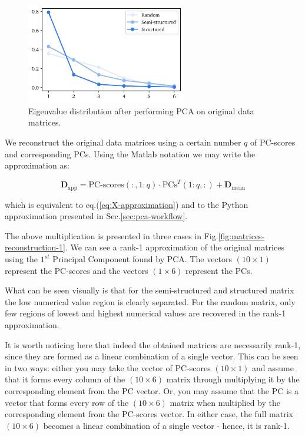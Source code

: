 \documentclass[10pt,twocolumn]{article}
\begin{document}
\begin{figure}[H]
\centering\includegraphics[width=7cm]{DWGs/matrix-reconstruction-eigenvalues-comparison.png}
\caption{Eigenvalue distribution after performing PCA on original data matrices.}			
\label{fig:eigenvalues}
\end{figure}

We reconstruct the original data matrices using a certain number $q$ of PC-scores and corresponding PCs. Using the Matlab notation we may write the approximation as:

\begin{equation} \label{eq:data-set-approximation}
\bm{D}_{\text{app}} = \text{PC-scores}(:,1:q) \cdot \text{PCs}^T(1:q,:) + \bm{D}_{\text{mean}}
\end{equation}

which is equivalent to eq.(\ref{eq:X-approximation}) and to the Python approximation presented in Sec.\ref{sec:pca-workflow}.

The above multiplication is presented in three cases in Fig.\ref{fig:matrices-reconstruction-1}. We can see a rank-1 approximation of the original matrices using the $1^{st}$ Principal Component found by PCA. The vectors $(10 \times 1)$ represent the PC-scores and the vectors $(1 \times 6)$ represent the PCs.

What can be seen visually is that for the semi-structured and structured matrix the low numerical value region is clearly separated. For the random matrix, only few regions of lowest and highest numerical values are recovered in the rank-1 approximation.


It is worth noticing here that indeed the obtained matrices are necessarily rank-1, since they are formed as a linear combination of a single vector. This can be seen in two ways: either you may take the vector of PC-scores $(10 \times 1)$ and assume that it forms every column of the $(10 \times 6)$ matrix through multiplying it by the corresponding element from the PC vector. Or, you may assume that the PC is a vector that forms every row of the $(10 \times 6)$ matrix when multiplied by the corresponding element from the PC-scores vector. In either case, the full matrix $(10 \times 6)$ becomes a linear combination of a single vector - hence, it is rank-1.
\end{document}
